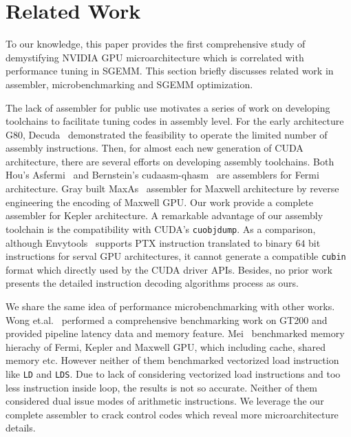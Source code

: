 \section{Related Work}
\label{sec:related}
To our knowledge, this paper provides the first comprehensive study of demystifying NVIDIA GPU microarchitecture which is correlated with performance tuning in SGEMM. This section briefly discusses related work in assembler, microbenchmarking and SGEMM optimization.

The lack of assembler for public use motivates a series of work on developing toolchains to facilitate tuning codes in assembly level. For the early architecture G80, Decuda~\cite{decuda} demonstrated the feasibility to operate the limited number of assembly instructions. Then, for almost each new generation of CUDA architecture, there are several efforts on developing assembly toolchains. Both Hou's Asfermi~\cite{asfermi} and Bernstein's cudaasm-qhasm~\cite{bernstein2012usable} are assemblers for Fermi architecture. Gray built MaxAs~\cite{maxas} assembler for Maxwell architecture by reverse engineering the encoding of Maxwell GPU. Our work provide a complete assembler for Kepler architecture. A remarkable advantage of our assembly toolchain is the compatibility with CUDA's {\tt cuobjdump}. As a comparison, although Envytools~\cite{envytools} supports PTX instruction translated to binary $64$ bit instructions for serval GPU architectures, it cannot generate a compatible {\tt cubin} format which directly used by the CUDA driver APIs. Besides, no prior work presents the detailed instruction decoding algorithms process as ours.

We share the same idea of performance microbenchmarking with other works. Wong et.al.~\cite{wong} performed a comprehensive benchmarking work on GT200 and provided pipeline latency data and
memory feature. Mei~\cite{mei} benchmarked memory hierachy
of Fermi, Kepler and Maxwell GPU, which including cache, shared memory etc. However neither of them benchmarked vectorized load instruction like {\tt LD} and {\tt LDS}. Due to lack of considering vectorized load instructions and too less instruction inside loop, the results is not so accurate. Neither of them considered dual issue modes of arithmetic instructions. We leverage the our complete assembler to crack control codes which reveal more microarchitecture details.

